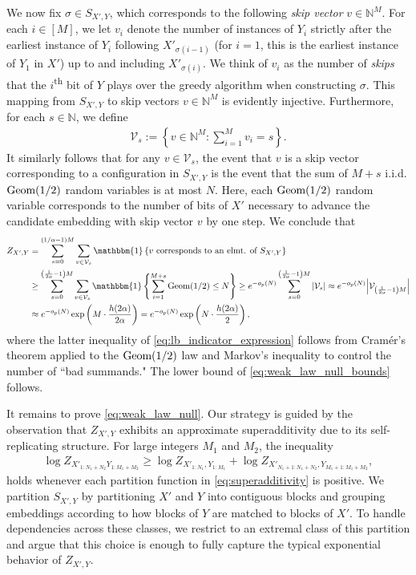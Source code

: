 \documentclass[11pt]{amsart}
\numberwithin{equation}{section}
\numberwithin{equation}{section}
\newcommand{\1}{\mathbbm{1}}
\newcommand{\Geom}{\textup{Geom}}
\newcommand{\N}{\mathbb{N}}
\theoremstyle{definition}
\begin{document}
We now fix $\sigma \in S_{X',Y}$, which corresponds to the following \emph{skip vector} $v \in \N^M$. For each $i \in [M]$, we let $v_i$ denote the number of instances of $Y_i$ strictly after the earliest instance of $Y_i$ following $X'_{\sigma(i-1)}$ (for $i = 1$, this is the earliest instance of $Y_1$ in $X'$) up to and including $X'_{\sigma(i)}$. We think of $v_i$ as the number of \textit{skips} that the $i$\textsuperscript{th} bit of $Y$ plays over the greedy algorithm when constructing $\sigma$. This mapping from $S_{X',Y}$ to skip vectors $v \in \N^M$ is evidently injective. Furthermore, for each $s \in \N$, we define
\begin{align*}
    \mathcal V_s := \left\{ v \in \N^M: \sum_{i=1}^M v_i = s \right\}.
\end{align*}
It similarly follows that for any $v \in \mathcal V_s$, the event that $v$ is a skip vector corresponding to a configuration in $S_{X',Y}$ is the event that the sum of $M+s$ i.i.d. $\Geom(1/2)$ random variables is at most $N$. Here, each $\Geom(1/2)$ random variable corresponds to the number of bits of $X'$ necessary to advance the candidate embedding with skip vector $v$ by one step. We conclude that
\begin{align}
    Z_{X',Y} & = \sum_{s=0}^{(1/\alpha-1)M} \sum_{v \in \mathcal V_s} \1\left\{ v \text{ corresponds to an elmt. of $S_{X',Y}$} \right\} \nonumber \\
    & \geq \sum_{s=0}^{\left(\frac{1}{2\alpha} - 1 \right)M} \sum_{v \in \mathcal V_s} \1\left\{ \sum_{i=1}^{M+s} \Geom(1/2) \leq N \right\} \geq e^{-o_p(N)} \sum_{s=0}^{\left(\frac{1}{2\alpha} - 1 \right)M} |\mathcal V_s| \approx e^{-o_p(N)} \Big|\mathcal V_{\left(\frac{1}{2\alpha} - 1 \right)M} \Big| \label{eq:lb_indicator_expression} \\
    & \approx e^{-o_p(N)} \exp\left(M \cdot \frac{h(2\alpha) }{2\alpha} \right) = e^{-o_p(N)} \exp\left(N \cdot \frac{h(2\alpha)}{2} \right), \nonumber
\end{align}
where the latter inequality of \eqref{eq:lb_indicator_expression} follows from Cram\'er's theorem applied to the $\Geom(1/2)$ law and Markov's inequality to control the number of ``bad summands." The lower bound of \eqref{eq:weak_law_null_bounds} follows.

\medskip

It remains to prove \eqref{eq:weak_law_null}. Our strategy is guided by the observation that $Z_{X',Y}$ exhibits an approximate superadditivity due to its self-replicating structure. For large integers $M_1$ and $M_2$, the inequality
\begin{align} \label{eq:superadditivity}
    \log Z_{X'_{1:N_1+N_2} Y_{1:M_1+M_2}} \geq \log Z_{X'_{1:N_1}, Y_{1:M_1}} + \log Z_{X'_{N_1+1:N_1+N_2}, Y_{M_1+1:M_1+M_2}},
\end{align}
holds whenever each partition function in \eqref{eq:superadditivity} is positive. We partition $S_{X',Y}$ by partitioning $X'$ and $Y$ into contiguous blocks and grouping embeddings according to how blocks of $Y$ are matched to blocks of $X'$. To handle dependencies across these classes, we restrict to an extremal class of this partition and argue that this choice is enough to fully capture the typical exponential behavior of $Z_{X',Y}$.
\end{document}
